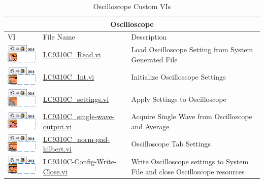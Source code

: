 \documentclass[11pt,a4paper,oldfontcommands]{memoir}
\begin{document}
\begin{table}[H]
	\centering
	\begin{tabular}{ m{2.5cm} | m{5cm} | m{5cm} }
		\hline
		\hline \multicolumn{3}{c}{Oscilloscope} \\ \hline \hline
		VI & File Name & Description \\ \hline
		\includegraphics[scale=0.625]{LC931C_Read_main} & \hyperref[LC9310C_Read]{LC9310C\_Read.vi} & Load Oscilloscope Setting from System Generated File \\ \hline
		\includegraphics[scale=0.625]{LC931C_Int_main_02} & \hyperref[LC9310C_Int]{LC9310C\_Int.vi} & Initialize Oscilloscope Settings \\ \hline
		\includegraphics[scale=0.625]{LC931C_settings_main_01} & \hyperref[LC9310C_settings]{LC9310C\_settings.vi} & Apply Settings to Oscilloscope \\ \hline
		\includegraphics[scale=0.625]{LC931C_single-wave-output_main_01} & \hyperref[LC9310C_swo]{LC9310C\_single-wave-output.vi} & Acquire Single Wave from Oscilloscope and Average \\ \hline
		\includegraphics[scale=0.625]{LC931C_norm-pad-hilbert_main_01} & \hyperref[LC9310C_nph]{LC9310C\_norm-pad-hilbert.vi} & Oscilloscope Tab Settings \\ \hline
		\includegraphics[scale=0.625]{LC931C-Config-Write-Close_main_01} & \hyperref[LC9310C_cwc]{LC9310C-Config-Write-Close.vi} & Write Oscilloscope settings to System File and close Oscilloscope resources \\ \hline
	\end{tabular}
	\caption{Oscilloscope Custom VIs}
	\label{tab:osc}
\end{table}
\end{document}
